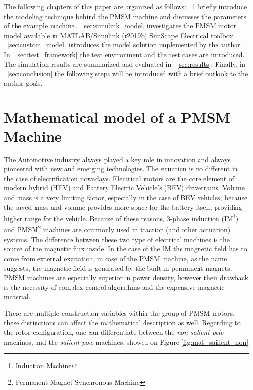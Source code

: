 \documentclass[twoside,b5paper,10pt]{article}
\begin{document}
The following chapters of this paper are organized as follows: \sectionname~\ref{sec:matPMSM} briefly introduce the modeling technique behind the PMSM machine and discusses the parameters of the example machine. \sectionname~\ref{sec:simulink_model} investigates the PMSM motor model available in MATLAB/Simulink (r2019b) SimScape Electrical toolbox. \sectionname~\ref{sec:custom_model} introduces the model solution implemented by the author. In \sectionname~\ref{sec:test_framework} the test environment and the test cases are introduced. The simulation results are summarized and evaluated in \sectionname~\ref{sec:results}. Finally, in \sectionname~\ref{sec:conclusion} the following steps will be introduced with a brief outlook to the author goals. 

\section{Mathematical model of a PMSM Machine}
\label{sec:matPMSM}

The Automotive industry always played a key role in innovation and always pioneered with new and emerging technologies. The situation is no different in the case of electrification nowadays. Electrical motors are the core element of modern hybrid (HEV) and Battery Electric Vehicle's (BEV) drivetrains. Volume and mass is a very limiting factor, especially in the case of BEV vehicles, because the saved mass and volume provides more space for the battery itself, providing higher range for the vehicle. Because of these reasons, 3-phase induction (IM\footnote{Induction Machine}) and PMSM\footnote{Permanent Magnet Synchronous Machine} machines are commonly used in traction (and other actuation) systems. The difference between these two type of electrical machines is the source of the magnetic flux inside. In the case of the IM the magnetic field has to come from external excitation, in case of the PMSM machine, as the name suggests, the magnetic field is generated by the built-in permanent magnets. PMSM machines are especially superior in power density, however their drawback is the necessity of complex control algorithms and the expensive magnetic material.

There are multiple construction variables within the group of PMSM motors, these distinctions can affect the mathematical description as well. Regarding to the rotor configuration, one can differentiate between the \emph{non-salient pole} machines, and the \emph{salient pole} machines, showed on Figure \ref{fig:mot_sailient_non}
\end{document}
